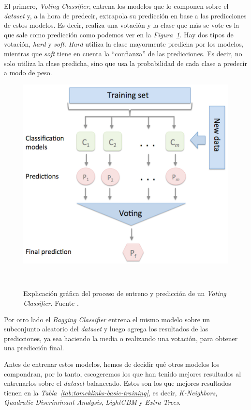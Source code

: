 El primero, \textit{Voting Classifier}, entrena los modelos que lo componen sobre el \textit{dataset} y, a la hora de predecir, extrapola su predicción en base a las predicciones de estos modelos. Es decir, realiza una votación y la clase que más se vote es la que sale como predicción como podemos ver en la \textit{Figura\ \ref{fig:voting-classifiers}}. Hay dos tipos de votación, \textit{hard} y \textit{soft}. \textit{Hard} utiliza la clase mayormente predicha por los modelos, mientras que \textit{soft} tiene en cuenta la ``confianza'' de las predicciones. Es decir, no solo utiliza la clase predicha, sino que usa la probabilidad de cada clase a predecir a modo de peso. \cite{Ensemble96:online}

\begin{figure}[!h]
    \centering
    \includegraphics[width=0.7\linewidth]{media/images/majority_voting.png}
    \caption{Explicación gráfica del proceso de entreno y predicción de un \textit{Voting Classifier}. Fuente \cite{Ensemble96:online}.}\ \label{fig:voting-classifiers}
\end{figure}

Por otro lado el \textit{Bagging Classifier} entrena el mismo modelo sobre un subconjunto aleatorio del \textit{dataset} y luego agrega los resultados de las predicciones, ya sea haciendo la media o realizando una votación, para obtener una predicción final.\ \cite{sklearne53:online}

Antes de entrenar estos modelos, hemos de decidir qué otros modelos los compondran, por lo tanto, escogeremos los que han tenido mejores resultados al entrenarlos sobre el \textit{dataset} balanceado. Estos son los que mejores resultados tienen en la \textit{Tabla\ \ref{tab:tomeklinks-basic-training}}, es decir, \textit{K-Neighbors}, \textit{Quadratic Discriminant Analysis}, \textit{LightGBM} y \textit{Extra Trees}.


